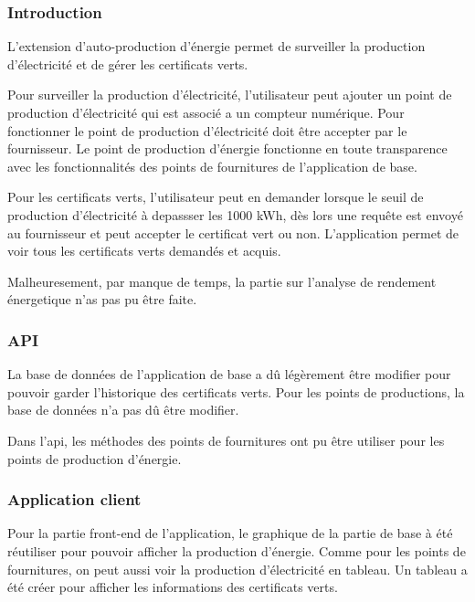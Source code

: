 \documentclass[../rapport.tex]{subfiles}
\begin{document}
\subsubsection{Introduction}

L'extension d'auto-production d'énergie permet de surveiller la production d'électricité et de gérer les certificats verts.

\vspace{4mm}

Pour surveiller la production d'électricité, l'utilisateur peut ajouter un point de production d'électricité qui est associé a un compteur numérique. Pour fonctionner le point de production d'électricité doit être accepter par le fournisseur. Le point de production d'énergie fonctionne en toute transparence avec les fonctionnalités des points de fournitures de l'application de base.

\vspace{4mm}

Pour les certificats verts, l'utilisateur peut en demander lorsque le seuil de production d'électricité à depassser les 1000 kWh, dès lors une requête est envoyé au fournisseur et peut accepter le certificat vert ou non.
L'application permet de voir tous les certificats verts demandés et acquis.

\vspace{4mm}

Malheuresement, par manque de temps, la partie sur l'analyse de rendement énergetique n'as pas pu être faite.

\subsubsection{API}

La base de données de l'application de base a dû légèrement être modifier pour pouvoir garder l'historique des certificats verts.
Pour les points de productions, la base de données n'a pas dû être modifier.

Dans l'api, les méthodes des points de fournitures ont pu être utiliser pour les points de production d'énergie.

\subsubsection{Application client}

Pour la partie front-end de l'application, le graphique de la partie de base à été réutiliser pour pouvoir afficher la production d'énergie. Comme pour les points de fournitures, on peut aussi voir la production d'électricité en tableau.
Un tableau a été créer pour afficher les informations des certificats verts.
\end{document}
